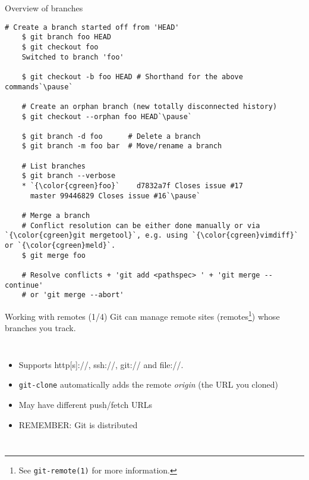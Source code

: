 \begin{frame}[fragile]{Overview of branches}
  \begin{lstlisting}[style=bash]
    # Create a branch started off from 'HEAD'
    $ git branch foo HEAD
    $ git checkout foo
    Switched to branch 'foo'

    $ git checkout -b foo HEAD # Shorthand for the above commands`\pause`

    # Create an orphan branch (new totally disconnected history)
    $ git checkout --orphan foo HEAD`\pause`

    $ git branch -d foo      # Delete a branch
    $ git branch -m foo bar  # Move/rename a branch

    # List branches
    $ git branch --verbose
    * `{\color{cgreen}foo}`    d7832a7f Closes issue #17
      master 99446829 Closes issue #16`\pause`

    # Merge a branch
    # Conflict resolution can be either done manually or via `{\color{cgreen}git mergetool}`, e.g. using `{\color{cgreen}vimdiff}` or `{\color{cgreen}meld}`.
    $ git merge foo

    # Resolve conflicts + 'git add <pathspec> ' + 'git merge --continue'
    # or 'git merge --abort'
  \end{lstlisting}
\end{frame}

\begin{frame}{Working with remotes (1/4)}
  Git can manage remote sites (remotes\footnote{See \texttt{git-remote(1)} for more information.}) whose branches you track.
  \begin{columns}
    \begin{itemize}
    \item Supports http[s]://, ssh://, git:// and file://.
    \item \texttt{git-clone} automatically adds the remote \emph{origin} (the URL you cloned)
    \item May have different push/fetch URLs
    \item<2> \alert{REMEMBER:} Git is distributed
    \end{itemize}

    \centering
  \end{columns}
\end{frame}

